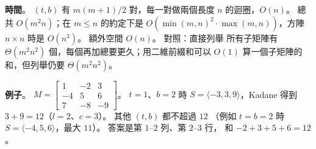\begin{pastsoln}
\textbf{時間}。 $(t, b)$ 有 $m(m+1)/2$ 對，每一對做兩個長度 $n$ 的迴圈，$O(n)$。 總共 $O(m^2 n)$；在 $m \le n$
的約定下是 $O(\min(m,n)^2 \cdot \max(m,n))$，方陣 $n \times n$ 時是 $O(n^3)$。 額外空間 $O(n)$。 對照：直接列舉
所有子矩陣有 $\Theta(m^2 n^2)$ 個，每個再加總要更久；用二維前綴和可以 $O(1)$ 算一個子矩陣的和，但列舉仍要
$\Theta(m^2 n^2)$。

\textbf{例子}。
$M = \begin{bmatrix} 1 & -2 & 3 \\ -4 & 5 & 6 \\ 7 & -8 & -9 \end{bmatrix}$。 $t = 1$、$b = 2$ 時
$S = \langle -3, 3, 9 \rangle$，Kadane 得到 $3 + 9 = 12$（$l = 2$、$c = 3$）。 其他 $(t, b)$ 都不超過 $12$
（例如 $t = b = 2$ 時 $S = \langle -4, 5, 6 \rangle$，最大 $11$）。 答案是第 $1$--$2$ 列、第 $2$--$3$ 行，
和 $-2 + 3 + 5 + 6 = 12$。
\end{pastsoln}
